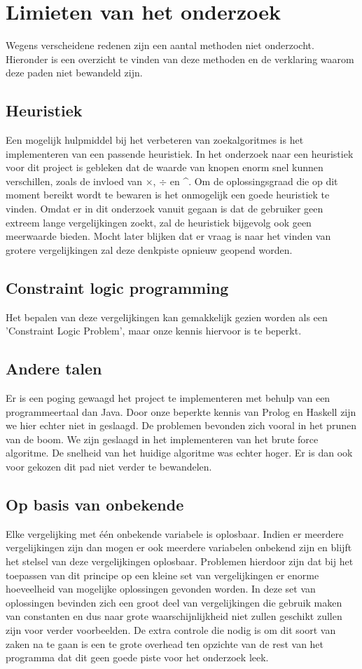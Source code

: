 \documentclass[Main.tex]{subfiles}
\begin{document}
\section{Limieten van het onderzoek}

Wegens verscheidene redenen zijn een aantal methoden niet onderzocht. Hieronder is een overzicht te vinden van deze methoden en de verklaring waarom deze paden niet bewandeld zijn. 

\subsection{Heuristiek}
Een mogelijk hulpmiddel bij het verbeteren van zoekalgoritmes is het implementeren van een passende heuristiek. In het onderzoek naar een heuristiek voor dit project is gebleken dat de waarde van knopen enorm snel kunnen verschillen, zoals de invloed van $\times$, $\div$ en \^{}. Om de oplossingsgraad die op dit moment bereikt wordt te bewaren is het onmogelijk een goede heuristiek te vinden. Omdat er in dit onderzoek vanuit gegaan is dat de gebruiker geen extreem lange vergelijkingen zoekt, zal de heuristiek bijgevolg ook geen meerwaarde bieden. Mocht later blijken dat er vraag is naar het vinden van grotere vergelijkingen zal deze denkpiste opnieuw geopend worden.

\subsection{Constraint logic programming}
Het bepalen van deze vergelijkingen kan gemakkelijk gezien worden als een 'Constraint Logic Problem', maar onze kennis hiervoor is te beperkt.

\subsection{Andere talen}
Er is een poging gewaagd het project te implementeren met behulp van een programmeertaal dan Java. Door onze beperkte kennis van Prolog en Haskell zijn we hier echter niet in geslaagd. De problemen bevonden zich vooral in het prunen van de boom. We zijn geslaagd in het implementeren van het brute force algoritme. De snelheid van het huidige algoritme was echter hoger. Er is dan ook voor gekozen dit pad niet verder te bewandelen.

\subsection{Op basis van onbekende}
Elke vergelijking met \'e\'en onbekende variabele is oplosbaar. Indien er meerdere vergelijkingen zijn dan mogen er ook meerdere variabelen onbekend zijn en blijft het stelsel van deze vergelijkingen oplosbaar. Problemen hierdoor zijn dat bij het toepassen van dit principe op een kleine set van vergelijkingen er enorme hoeveelheid van mogelijke oplossingen gevonden worden. In deze set van oplossingen bevinden zich een groot deel van vergelijkingen die gebruik maken van constanten en dus naar grote waarschijnlijkheid niet zullen geschikt zullen zijn voor verder voorbeelden. De extra controle die nodig is om dit soort van zaken na te gaan is een te grote overhead ten opzichte van de rest van het programma dat dit geen goede piste voor het onderzoek leek.
\end{document}
